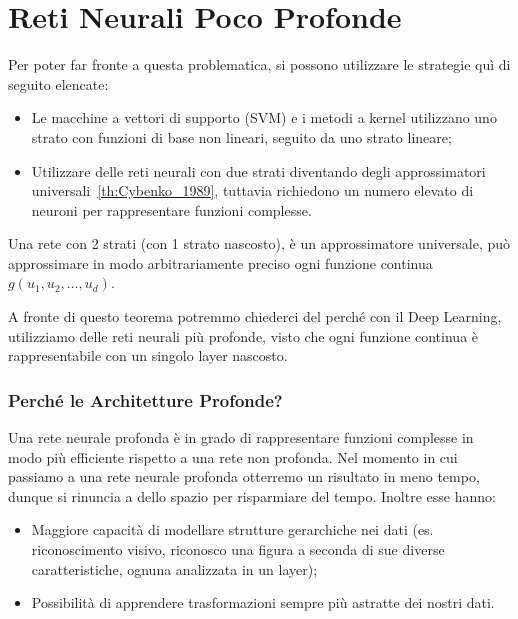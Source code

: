 \section{Reti Neurali Poco Profonde}
Per poter far fronte a questa problematica, si possono utilizzare le strategie quì di seguito elencate:

\begin{itemize}
    \item Le macchine a vettori di supporto (SVM) e i metodi a kernel utilizzano uno strato con funzioni di base non lineari, seguito da uno strato lineare;
    \item Utilizzare delle reti neurali con due strati diventando degli approssimatori universali~\ref{th:Cybenko_1989}, tuttavia richiedono un numero elevato di neuroni per rappresentare funzioni complesse.
\end{itemize}

\begin{Teorema}
    Una rete con 2 strati (con 1 strato nascosto), è un approssimatore universale, può approssimare in modo arbitrariamente preciso ogni funzione continua $g(u_1,u_2,\dots,u_d)$.
    \label{th:Cybenko_1989}
\end{Teorema}

A fronte di questo teorema potremmo chiederci del perché con il Deep Learning, utilizziamo delle reti neurali più profonde, visto che ogni funzione continua è rappresentabile con un singolo layer nascosto.

\subsubsection{Perché le Architetture Profonde?}
Una rete neurale profonda è in grado di rappresentare funzioni complesse in modo più efficiente rispetto a una rete non profonda. Nel momento in cui passiamo a una rete neurale profonda otterremo un risultato in meno tempo, dunque si rinuncia a dello spazio per risparmiare del tempo. Inoltre esse hanno:
\begin{itemize}
    \item Maggiore capacità di modellare strutture gerarchiche nei dati  (es. riconoscimento visivo, riconosco una figura a seconda di sue diverse caratteristiche, ognuna analizzata in un layer);
    \item Possibilità di apprendere trasformazioni sempre più astratte dei nostri dati.
\end{itemize}

